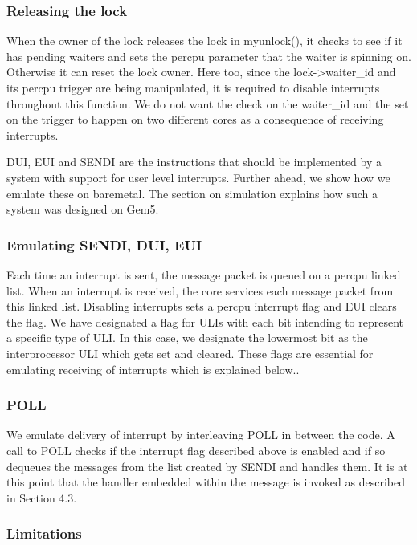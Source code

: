 \subsubsection{Releasing the lock}

When the owner of the lock releases the lock in myunlock(), it checks to see if
it has pending waiters and sets the percpu parameter that the waiter is spinning
on. Otherwise it can reset the lock owner. Here too, since the lock->waiter\_id
and its percpu trigger are being manipulated, it is required to disable
interrupts throughout this function. We do not want the check on the waiter\_id
and the set on the trigger to happen on two different cores as a consequence of
receiving interrupts.

DUI, EUI and SENDI are the instructions that should be implemented by a system
with support for user level interrupts. Further ahead, we show how we emulate
these on baremetal. The section on simulation explains how such a system was
designed on Gem5.

\subsubsection{Emulating SENDI, DUI, EUI}

Each time an interrupt is sent, the message packet is queued on a percpu linked
list. When an interrupt is received, the core services each message packet from
this linked list. Disabling interrupts sets a percpu interrupt flag and EUI clears
the flag. We have designated a flag for ULIs with each bit intending to represent
a specific type of ULI.  In this case, we designate the lowermost bit as the
interprocessor ULI which gets set and cleared. These flags are essential for
emulating receiving of interrupts which is explained below..

\subsubsection{POLL}

We emulate delivery of interrupt by interleaving POLL in between the code. A
call to POLL checks if the interrupt flag described above is enabled and if so
dequeues the messages from the list created by SENDI and handles them.  It is at
this point that the handler embedded within the message is invoked as described
in Section 4.3.

\subsubsection{Limitations}

